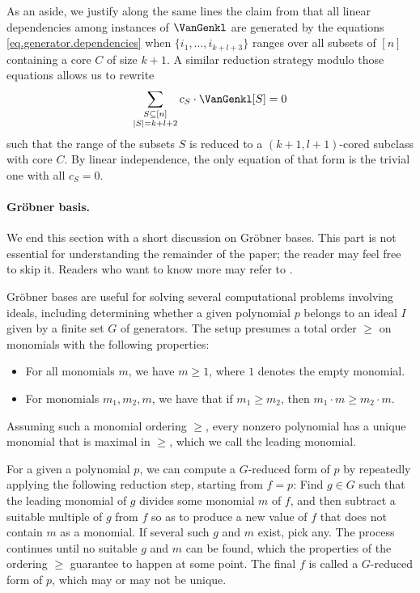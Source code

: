 As an aside, we justify along the same lines the claim from   that all linear dependencies among instances of $\VanGenkl$ are generated by the equations \eqref{eq.generator.dependencies} when $\{i_1, \dots, i_{k+l+3}\}$ ranges over all subsets of $[n]$ containing a core $C$ of size $k+1$. A similar reduction strategy modulo those equations allows us to rewrite 
\[
\sum_{\substack{S \subseteq [n] \\ |S|=k+l+2}} c_S \cdot  \VanGenkl[S] = 0
\]
such that the range of the subsets $S$ is reduced to a $(k+1,l+1)$-cored subclass with core $C$. By linear independence, the only equation of that form is the trivial one with all $c_S=0$.

\paragraph{Gr\"obner basis.} We end this section with a short discussion on Gr\"obner bases. This part is not essential for understanding the remainder of the paper; the reader may feel free to skip it. Readers who want to know more may refer to \cite{AL1994,CLO2013}.

Gr\"obner bases are useful for solving several computational problems involving ideals, including determining whether a given polynomial $p$ belongs to an ideal $I$ given by a finite set $G$ of generators. The setup presumes a total order $\ge$ on monomials with the following properties:
\begin{itemize}
    \item For all monomials $m$, we have $m \ge 1$, where $1$ denotes the empty monomial.
    \item For monomials $m_1,m_2,m$, we have that if $m_1\ge m_2$, then $m_1\cdot m \ge m_2\cdot m$.
\end{itemize}
Assuming such a monomial ordering $\ge$, every nonzero polynomial has a unique monomial that is maximal in $\ge$, which we call the leading monomial. 

For a given a polynomial $p$, we can compute a $G$-reduced form of $p$ by repeatedly applying the following reduction step, starting from $f=p$: Find $g\in G$ such that the leading monomial of $g$ divides some monomial $m$ of $f$, and then subtract a suitable multiple of $g$ from $f$ so as to produce a new value of $f$ that does not contain $m$ as a monomial. If several such $g$ and $m$ exist, pick any. The process continues until no suitable $g$ and $m$ can be found, which the properties of the ordering $\ge$ guarantee to happen at some point. The final $f$ is called a $G$-reduced form of $p$, which may or may not be unique.


